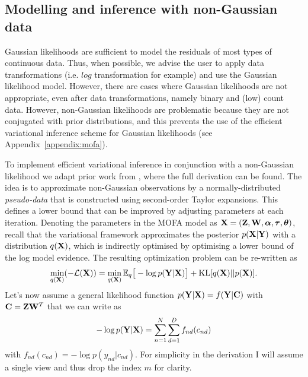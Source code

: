 \subsection{Modelling and inference with non-Gaussian data} \label{section:mofa_ngaussian}

Gaussian likelihoods are sufficient to model the residuals of most types of continuous data. Thus, when possible, we advise the user to apply data transformations (i.e. $log$ transformation for example) and use the Gaussian likelihood model. However, there are cases where Gaussian likelihoods are not appropriate, even after data transformations, namely binary and (low) count data. However, non-Gaussian likelihoods are problematic because they are not conjugated with prior distributions, and this prevents the use of the efficient variational inference scheme for Gaussian likelihoods (see Appendix~\ref{appendix:mofa}).

To implement efficient variational inference in conjunction with a non-Gaussian likelihood we adapt prior work from \cite{Seeger2012}, where the full derivation can be found. The idea is to approximate non-Gaussian observations by a normally-distributed \textit{pseudo-data} that is constructed using second-order Taylor expansions. This defines a lower bound that can be improved by adjusting parameters at each iteration. Denoting the parameters in the MOFA model as ${\bf X}= ({\bf Z},{\bf W},\mbox{\boldmath $\alpha$},\mbox{\boldmath $\tau$},\mbox{\boldmath $\theta$})$, recall that the variational framework approximates the posterior $p({\bf X} | {\bf Y} )$ with a distribution $q({\bf X})$, which is indirectly optimised by optimising a lower bound of the log model evidence. The resulting optimization problem can be re-written as
\begin{equation*}
\min_{q({\bf X})} (-\mathcal{L}({\bf X})) =  \min_{q({\bf X})} \mathbb{E}_q \big[ -\log p({\bf Y}|{\bf X}) \big] + {\rm KL}[q({\bf X})||p({\bf X})].
\end{equation*}
Let's now assume a general likelihood function $p({\bf Y}|{\bf X})=f({\bf Y}|{\bf C})$ with ${\bf C} = {\bf Z}{\bf W}^{T}$ that we can write as
\begin{equation*}
-\log p({\bf Y}|{\bf X}) = \sum_{n=1}^{N} \sum_{d=1}^{D} f_{nd} (c_{nd})
\end{equation*}
with $f_{nd}(c_{nd}) = -\log p(y_{nd}|c_{nd})$. For simplicity in the derivation I will assume a single view and thus drop the index $m$ for clarity.

